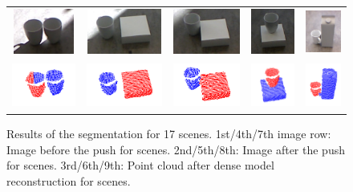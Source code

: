\begin{figure}[h!]
\begin{tabular}{ccccc}
    \includegraphics[height=1.5cm]{pictures/132.jpg}&
    \includegraphics[height=1.5cm]{pictures/142.jpg}&
    \includegraphics[height=1.5cm]{pictures/152.jpg}&
    \includegraphics[height=1.5cm]{pictures/162.jpg}&
    \includegraphics[height=1.5cm]{pictures/172.jpg}\\ 
    \includegraphics[height=1.5cm]{pictures/133.png}&
    \includegraphics[height=1.5cm]{pictures/143.png}&
    \includegraphics[height=1.5cm]{pictures/153.png}&
    \includegraphics[height=1.5cm]{pictures/163.png}&
    \includegraphics[height=1.5cm]{pictures/173.png}\\
    \end{tabular}

    	\caption[Results  of the  segmentation for  17  scenes.]{Results  of the  segmentation for  17  scenes.  1st/4th/7th
          image row:  Image before  the push  for scenes.   2nd/5th/8th:
          Image after the push for scenes.  3rd/6th/9th: Point cloud
          after dense model reconstruction for scenes.}
    \label{fig:evaluation1}
\end{figure}

